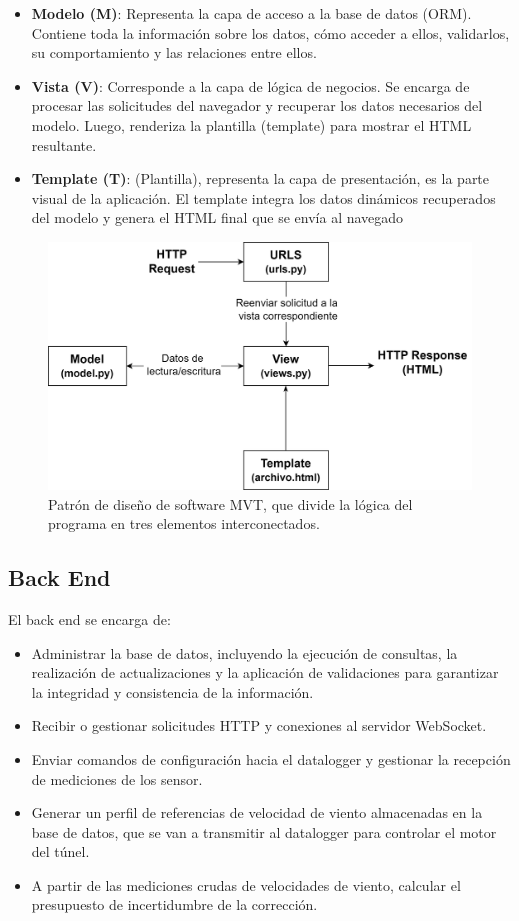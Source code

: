 \begin{itemize}
    \item \textbf{Modelo (M)}: Representa la capa de acceso a la base de datos (ORM). Contiene toda la información sobre los datos, cómo acceder a ellos, validarlos, su comportamiento y las relaciones entre ellos.
    \item \textbf{Vista (V)}:  Corresponde a la capa de lógica de negocios. Se encarga de procesar las solicitudes del navegador y recuperar los datos necesarios del modelo. Luego, renderiza la plantilla (template) para mostrar el HTML resultante.
    \item \textbf{Template (T)}: (Plantilla), representa la capa de presentación, es la parte visual de la aplicación. El template integra los datos dinámicos recuperados del modelo y genera el HTML final que se envía al navegado

\end{itemize}
\begin{figure}[H]
    \centering
    \includegraphics[width=0.8\linewidth]{Figuras/AplicacionWeb/patronMVT.png}
    \caption{Patrón de diseño de software MVT, que divide la lógica del programa en tres elementos interconectados.}
    \label{fig:patronMVT}
\end{figure}

\subsection{Back End}\label{sec:back_end}
El back end se encarga de:
\begin{itemize}
    \item Administrar la base de datos, incluyendo la ejecución de consultas, la realización de actualizaciones y la aplicación de validaciones para garantizar la integridad y consistencia de la información.
    \item Recibir o gestionar solicitudes HTTP y conexiones al servidor WebSocket.
    \item Enviar comandos de configuración hacia el datalogger y gestionar la recepción de mediciones de los sensor.
    \item Generar un perfil de referencias de velocidad de viento almacenadas en la base de datos, que se van a transmitir al datalogger para controlar el motor del túnel.
    \item A partir de las mediciones crudas de velocidades de viento, calcular el presupuesto de incertidumbre de la corrección.
\end{itemize}

